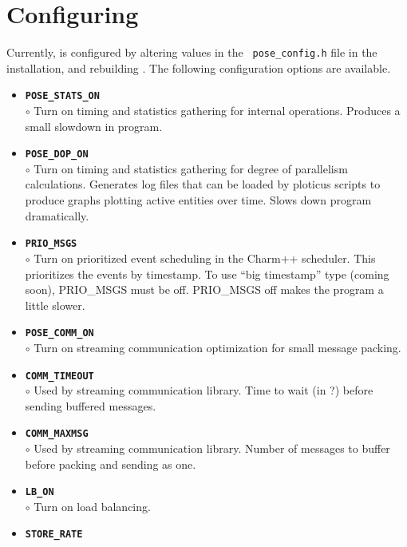 \section{Configuring \pose{}}

Currently, \pose{} is configured by altering values in the {\tt
pose\_config.h} file in the \pose{} installation, and rebuilding
\pose{}.  The following configuration options are available.

\begin{itemize}
\item {\tt {\bf POSE\_STATS\_ON}}\\
	$\circ$ Turn on timing and statistics gathering for internal \pose{}
	operations.  Produces a small slowdown in program.\\
\item {\tt {\bf POSE\_DOP\_ON}}\\
	$\circ$ Turn on timing and statistics gathering for degree of parallelism calculations.  Generates log files that can be loaded by ploticus scripts to produce graphs plotting active entities over time.  Slows down program dramatically.\\
\item {\tt {\bf PRIO\_MSGS}}\\ $\circ$ Turn on prioritized event
	scheduling in the Charm++ scheduler.  This prioritizes the
	events by timestamp.  To use ``big timestamp'' type (coming
	soon), PRIO\_MSGS must be off.  PRIO\_MSGS off makes the program
	a little slower.\\
\item {\tt {\bf POSE\_COMM\_ON}}\\
	$\circ$ Turn on streaming communication optimization for small message packing.\\
\item {\tt {\bf COMM\_TIMEOUT}}\\
	$\circ$ Used by streaming communication library. Time to wait (in ?) before sending buffered messages.\\
\item {\tt {\bf COMM\_MAXMSG}}\\
	$\circ$ Used by streaming communication library.  Number of messages to buffer before packing and sending as one.\\
\item {\tt {\bf LB\_ON}}\\
	$\circ$ Turn on \pose{} load balancing.\\
\item {\tt {\bf STORE\_RATE}}\\

\end{itemize}
